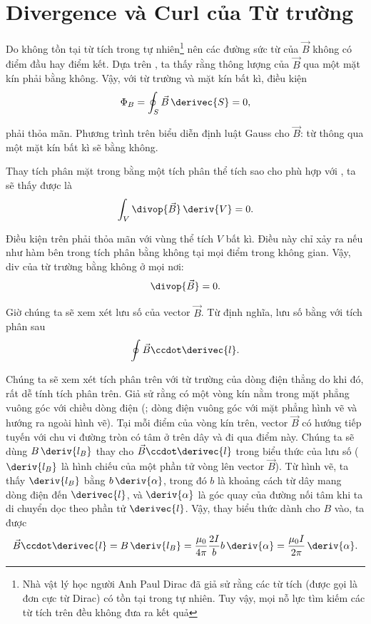 \section{Divergence và Curl của Từ trường}\label{sec:6_11}

Do không tồn tại từ tích trong tự nhiên\footnote{Nhà vật lý học người Anh Paul Dirac đã giả sử rằng các từ tích (được gọi là đơn cực từ Dirac) có tồn tại trong tự nhiên. Tuy vậy, mọi nỗ lực tìm kiếm các từ tích trên đều không đưa ra kết quả} nên các đường sức từ của $\vec{B}$ không có điểm đầu hay điểm kết. Dựa trên , ta thấy rằng thông lượng của $\vec{B}$ qua một mặt kín phải bằng không. Vậy, với từ trường và mặt kín bất kì, điều kiện
\begin{equation}\label{eq:6_95}
    \Phi_B = \oint_S \vec{B}\, \derivec{S} = 0,
\end{equation}

\noindent
phải thỏa mãn. Phương trình trên biểu diễn định luật Gauss cho $\vec{B}$: từ thông qua một mặt kín bất kì sẽ bằng không.

Thay tích phân mặt trong  bằng một tích phân thể tích sao cho phù hợp với , ta sẽ thấy được là
\begin{equation*}
    \int_V \divop{\vec{B}}\, \deriv{V} = 0.
\end{equation*}

\noindent
Điều kiện trên phải thỏa mãn với vùng thể tích $V$ bất kì. Điều này chỉ xảy ra nếu như hàm bên trong tích phân bằng không tại mọi điểm trong không gian. Vậy, div của từ trường bằng không ở mọi nơi: 
\begin{equation}\label{eq:6_96}
    \divop{\vec{B}} = 0.
\end{equation}

Giờ chúng ta sẽ xem xét lưu số của vector $\vec{B}$. Từ định nghĩa, lưu số bằng với tích phân sau
\begin{equation}\label{eq:6_97}
    \oint \vec{B} \ccdot \derivec{l}.
\end{equation}

\noindent
Chúng ta sẽ xem xét tích phân trên với từ trường của dòng điện thẳng do khi đó, rất dễ tính tích phân trên. Giả sử rằng có một vòng kín nằm trong mặt phẳng vuông góc với chiều dòng điện (; dòng điện vuông góc với mặt phẳng hình vẽ và hướng ra ngoài hình vẽ). Tại mỗi điểm của vòng kín trên, vector $\vec{B}$ có hướng tiếp tuyến với chu vi đường tròn có tâm ở trên dây và đi qua điểm này. Chúng ta sẽ dùng $B\,\deriv{l_B}$ thay cho $\vec{B}\ccdot \derivec{l}$ trong biểu thức của lưu số ($\deriv{l_B}$ là hình chiếu của một phần tử vòng lên vector $\vec{B}$). Từ hình vẽ, ta thấy $\deriv{l_B}$ bằng $b\,\deriv{\alpha}$, trong đó $b$ là khoảng cách từ dây mang dòng điện đến $\derivec{l}$, và $\deriv{\alpha}$ là góc quay của đường nối tâm khi ta di chuyển dọc theo phần tử $\derivec{l}$.
Vậy, thay biểu thức  dành cho $B$ vào, ta được
\begin{equation}\label{eq:6_98}
    \vec{B} \ccdot \derivec{l} = B\,\deriv{l_B} = \frac{\mu_0}{4\pi} \frac{2I}{b} b\, \deriv{\alpha} = \frac{\mu_0 I}{2\pi}\, \deriv{\alpha}.
\end{equation}

